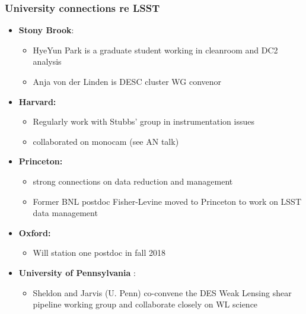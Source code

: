 \documentclass{beamer}
\begin{document}
\begin{frame}
  \frametitle{University connections re LSST}

  \begin{itemize}


    \item \textbf{Stony Brook}:
      \begin{itemize}
      \item HyeYun Park is a graduate student working in cleanroom and
        DC2 analysis
      \item Anja von der Linden is DESC cluster WG convenor
      \end{itemize}


    \item \textbf{Harvard:}
      \begin{itemize}
      \item Regularly work with Stubbs' group in instrumentation
        issues
      \item collaborated on monocam (see AN talk)
      \end{itemize}

    \item \textbf{Princeton:}
      \begin{itemize}
      \item strong connections on data reduction and management
      \item Former BNL postdoc Fisher-Levine moved to Princeton to
        work on LSST data management
      \end{itemize}
    \item \textbf{Oxford:}
      \begin{itemize}
      \item Will station one postdoc in fall 2018
      \end{itemize}

    \item \textbf{University of Pennsylvania }:
      \begin{itemize}
          \item Sheldon and Jarvis (U. Penn) co-convene the DES Weak Lensing 
              shear pipeline working group and collaborate closely on WL science
      \end{itemize}


\end{itemize}
\end{frame}
\end{document}
